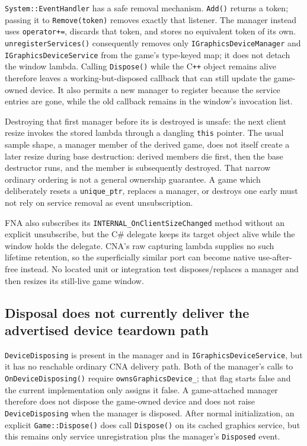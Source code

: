 \texttt{System::EventHandler} has a safe removal mechanism. \texttt{Add()} returns a token;
passing it to \texttt{Remove(token)} removes exactly that listener. The manager instead uses
\texttt{operator+=}, discards that token, and stores no equivalent token of its own.
\texttt{unregisterServices()} consequently removes only
\texttt{IGraphicsDevice}\allowbreak\texttt{Manager} and
\texttt{IGraphicsDevice}\allowbreak\texttt{Service} from the game's type-keyed map; it does not detach the window
lambda. Calling \texttt{Dispose()} while the C\texttt{++} object remains alive therefore leaves a
working-but-disposed callback that can still update the game-owned device. It also permits a new
manager to register because the service entries are gone, while the old callback remains in the
window's invocation list.

Destroying that first manager before its  is destroyed is unsafe: the next client
resize invokes the stored lambda through a dangling \texttt{this} pointer. The usual sample
shape, a manager member of the derived game, does not itself create a later resize during base
 destruction: derived members die first, then the base destructor runs, and the
 member is subsequently destroyed. That narrow ordinary ordering is not a
general ownership guarantee. A game which deliberately resets a \texttt{unique\_ptr}, replaces a
manager, or destroys one early must not rely on service removal as event unsubscription.

FNA also subscribes its \texttt{INTERNAL\_OnClientSizeChanged} method without an explicit
unsubscribe, but the C\# delegate keeps its target object alive while the window holds the
delegate. CNA's raw capturing lambda supplies no such lifetime retention, so the superficially
similar port can become native use-after-free instead. No located unit or integration test
disposes/replaces a manager and then resizes its still-live game window.

\subsection{Disposal does not currently deliver the advertised device teardown path}

\texttt{DeviceDisposing} is present in the manager and in
\texttt{IGraphicsDeviceService}, but it has no reachable ordinary CNA delivery path. Both of the
manager's calls to \texttt{OnDeviceDisposing()} require \texttt{ownsGraphicsDevice\_}; that flag
starts false and the current implementation only assigns it false. A game-attached manager
therefore does not dispose the game-owned device and does not raise \texttt{DeviceDisposing} when
the manager is disposed. After normal initialization, an explicit \texttt{Game::Dispose()} does
call \texttt{Dispose()} on its cached graphics service, but this remains only service
unregistration plus the manager's \texttt{Disposed} event.

